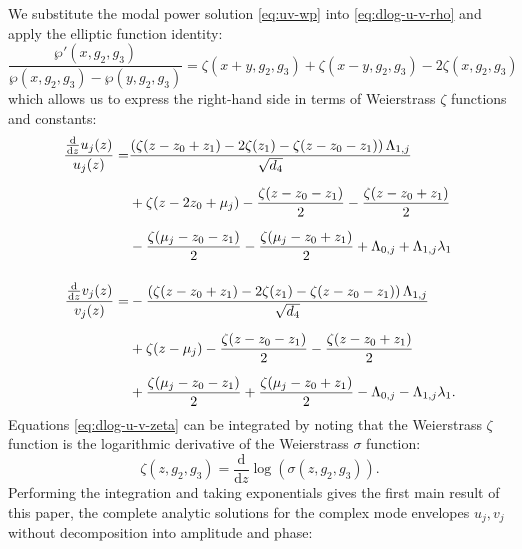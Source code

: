 \documentclass[11pt,a4paper]{article}
\numberwithin{equation}{section}
\begin{document}
We substitute the modal power solution \eqref{eq:uv-wp} into \eqref{eq:dlog-u-v-rho} and apply the elliptic function identity:
\begin{equation}
\frac{\wp'{\left(x,g_{2},g_{3} \right)}}{\wp{\left(x,g_{2},g_{3} \right)} - \wp{\left(y,g_{2},g_{3} \right)}} = \zeta{\left(x + y,g_{2},g_{3} \right)} + \zeta{\left(x - y,g_{2},g_{3} \right)} - 2 \zeta{\left(x,g_{2},g_{3} \right)}
\end{equation}
which allows us to express the right-hand side in terms of Weierstrass $\zeta$ functions and constants:
\begin{align}
\frac{\frac{\mathrm{d}}{\mathrm{d}z} u_j{\left(z\right)}}{u_j{\left(z\right)}} =& \frac{\left(\zeta{\left(z - z_{0} + z_{1} \right)} - 2 \zeta{\left(z_{1} \right)} - \zeta{\left(z - z_{0} - z_{1} \right)}\right) {\Lambda}_{1,j}}{\sqrt{{d}_{4}}} \nonumber \\[6pt]
& + \zeta{\left(z - 2 z_{0} + {\mu}_{j} \right)} - \frac{\zeta{\left(z - z_{0} - z_{1} \right)}}{2} - \frac{\zeta{\left(z - z_{0} + z_{1} \right)}}{2} \nonumber \\[6pt]
& - \frac{\zeta{\left({\mu}_{j} - z_{0} - z_{1}\right)}}{2} - \frac{\zeta{\left({\mu}_{j} - z_{0} + z_{1}\right)}}{2} + {\Lambda}_{0,j} + {\Lambda}_{1,j} {\lambda}_{1} \notag \\[12pt]
\frac{\frac{\mathrm{d}}{\mathrm{d}z} v_j{\left(z\right)}}{v_j{\left(z\right)}} =& - \frac{\left(\zeta{\left(z - z_{0} + z_{1} \right)} - 2 \zeta{\left(z_{1} \right)} - \zeta{\left(z - z_{0} - z_{1} \right)}\right) {\Lambda}_{1,j}}{\sqrt{{d}_{4}}} \nonumber \\[6pt]
& + \zeta{\left(z - {\mu}_{j} \right)} - \frac{\zeta{\left(z - z_{0} - z_{1} \right)}}{2} - \frac{\zeta{\left(z - z_{0} + z_{1} \right)}}{2} \nonumber \\[6pt]
& + \frac{\zeta{\left({\mu}_{j} - z_{0} - z_{1}\right)}}{2} + \frac{\zeta{\left({\mu}_{j} - z_{0} + z_{1} \right)}}{2} - {\Lambda}_{0,j} - {\Lambda}_{1,j} {\lambda}_{1}. \label{eq:dlog-u-v-zeta}
\end{align}
Equations \eqref{eq:dlog-u-v-zeta} can be integrated by noting that the Weierstrass $\zeta$ function is the logarithmic derivative of the Weierstrass $\sigma$ function:
\begin{equation}
\label{eq:zeta-dlog_sigma}
\zeta\left(z, g_2, g_3\right)=\frac{\mathrm{d}}{\mathrm{d}z} \log{\left(\sigma\left(z, g_2, g_3\right)\right)}.
\end{equation}
Performing the integration and taking exponentials gives the first main result of this paper, the complete analytic solutions for the complex mode envelopes $u_j, v_j$ without decomposition into amplitude and phase:
\end{document}
